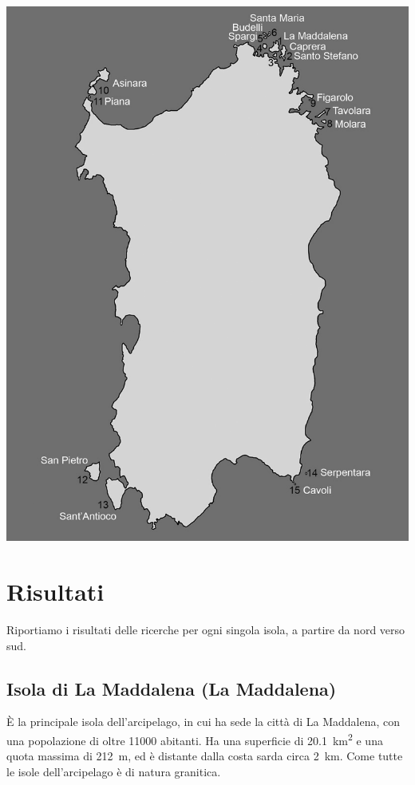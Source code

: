 \begin{multicols}{2}
\begin{Figure} %
  \centering\small
  \includegraphics[width=\linewidth]{abstracts/extended_abstracts/C022_Figure1.png}
\end{Figure}

\section*{Risultati}
Riportiamo i risultati delle ricerche per ogni singola isola, a partire da nord verso sud.

\subsection*{Isola di La Maddalena (La Maddalena)}
È la principale isola dell’arcipelago, in cui ha sede la città di La Maddalena, con una popolazione di oltre 11000 abitanti. Ha una superficie di \SI{20.1}{\square\kilo\meter} e una quota massima di 212~m, ed è distante dalla costa sarda circa 2~km. Come tutte le isole dell’arcipelago è di natura granitica.


\end{multicols}
